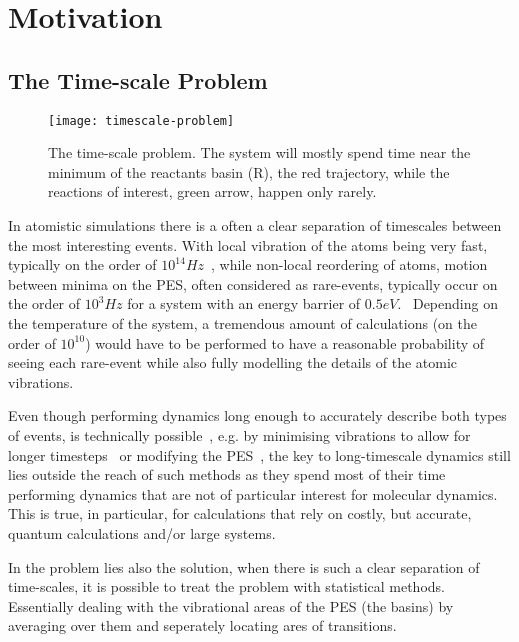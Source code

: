 \section{Motivation}
\subsection{The Time-scale Problem}
\label{sec:tst-timescale-problem}

\begin{figure}[h]
\begin{center}
\texttt{[image: timescale-problem]}
    \parbox{0.85\linewidth}{
\caption{The time-scale problem.
The system will mostly spend time near the minimum of the reactants basin (R), the red trajectory, while the reactions of interest, green arrow, happen only rarely.}
\label{fig:timescale-problem}
    }
\end{center}
\end{figure}

In atomistic simulations there is a often a clear separation of timescales between the most interesting events.
With local vibration of the atoms being very fast, typically on the order of $10^{14} \unit{Hz}$~\cite{mcquarrie-1983},
while non-local reordering of atoms, motion between minima on the PES, often considered as rare-events, typically occur on the order of $10^3 \unit{Hz}$ for a system with an energy barrier of $0.5 \unit{eV}$.~\citemiss
Depending on the temperature of the system, a tremendous amount of calculations (on the order of $10^{10}$) would have to be performed to have a reasonable probability of seeing each rare-event while also fully modelling the details of the atomic vibrations.

Even though performing dynamics long enough to accurately describe both types of events, is technically possible~\citemiss, e.g. by minimising vibrations to allow for longer timesteps~\cite{shake-1977, rattle-1983} or modifying the PES~\cite{hyperdynamics-voter-1997}, the key to long-timescale dynamics still lies outside the reach of such methods as they spend most of their time performing dynamics that are not of particular interest for molecular dynamics.
This is true, in particular, for calculations that rely on costly, but accurate, quantum calculations and/or large systems.

In the problem lies also the solution, when there is such a clear separation of time-scales, it is possible to treat the problem with statistical methods.
Essentially dealing with the vibrational areas of the PES (the basins) by averaging over them and seperately locating ares of transitions.

